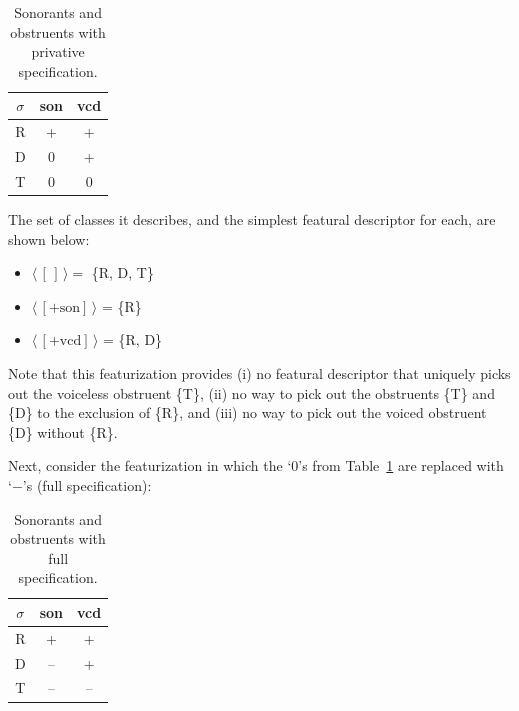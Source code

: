 \documentclass[11pt, oneside]{article}   	%
\begin{document}
\begin{table}[h]
    \centering
    \begin{tabular} {|c||c|c|}
    \hline
        $\sigma$ & son & vcd \\ \hline
        R & + & + \\
        D & 0 & + \\
        T & 0 & 0 \\
        \hline
    \end{tabular}
    \caption{Sonorants and obstruents with privative specification.}
    \label{table:privative}
\end{table}

\noindent The set of classes it describes, and the simplest featural descriptor for each, are shown below: \begin{itemize}
  \item $\langle \, [\,] \, \rangle = $ \{R, D, T\}
  \item $\langle \, [+\text{son}] \, \rangle$ = \{R\}
  \item $\langle \, [+\text{vcd}] \, \rangle$ = \{R, D\}
  \end{itemize}
  
\noindent Note that this featurization provides (i) no featural descriptor that uniquely picks out the voiceless obstruent \{T\}, (ii) no way to pick out the obstruents \{T\} and \{D\} to the exclusion of \{R\}, and (iii) no way to pick out the voiced obstruent \{D\} without \{R\}.

Next, consider the featurization in which the `$0$'s from Table~\ref{table:privative} are replaced with `$-$'s (full specification):

\begin{table}[h]
    \centering
    \begin{tabular} {|c||c|c|}
    \hline
        $\sigma$ & son & vcd \\ \hline
        R & + & + \\
        D & -- & + \\
        T & -- & -- \\
        \hline
    \end{tabular}
    \caption{Sonorants and obstruents with full specification.}
    \label{table:full}
\end{table}
\end{document}
